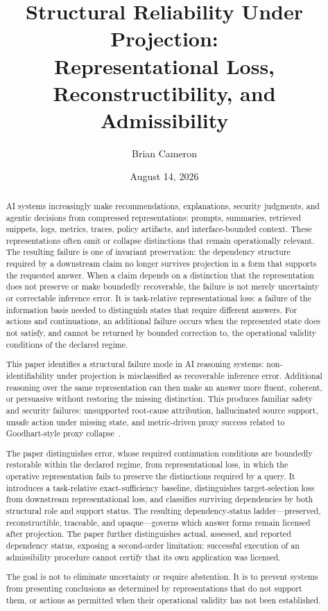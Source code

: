 \documentclass[11pt]{article}
\title{Structural Reliability Under Projection:\\
Representational Loss, Reconstructibility, and Admissibility}
\author{Brian Cameron}
\date{August 14, 2026}
\begin{document}
\maketitle

\begin{abstract}
AI systems increasingly make recommendations, explanations, security judgments, and agentic decisions from compressed representations: prompts, summaries, retrieved snippets, logs, metrics, traces, policy artifacts, and interface-bounded context. These representations often omit or collapse distinctions that remain operationally relevant. The resulting failure is one of invariant preservation: the dependency structure required by a downstream claim no longer survives projection in a form that supports the requested answer. When a claim depends on a distinction that the representation does not preserve or make boundedly recoverable, the failure is not merely uncertainty or correctable inference error. It is task-relative representational loss: a failure of the information basis needed to distinguish states that require different answers. For actions and continuations, an additional failure occurs when the represented state does not satisfy, and cannot be returned by bounded correction to, the operational validity conditions of the declared regime.

This paper identifies a structural failure mode in AI reasoning systems: non-identifiability under projection is misclassified as recoverable inference error. Additional reasoning over the same representation can then make an answer more fluent, coherent, or persuasive without restoring the missing distinction. This produces familiar safety and security failures: unsupported root-cause attribution, hallucinated source support, unsafe action under missing state, and metric-driven proxy success related to Goodhart-style proxy collapse~\cite{Goodhart1975}.

The paper distinguishes error, whose required continuation conditions are boundedly restorable within the declared regime, from representational loss, in which the operative representation fails to preserve the distinctions required by a query. It introduces a task-relative exact-sufficiency baseline, distinguishes target-selection loss from downstream representational loss, and classifies surviving dependencies by both structural role and support status. The resulting dependency-status ladder---preserved, reconstructible, traceable, and opaque---governs which answer forms remain licensed after projection. The paper further distinguishes actual, assessed, and reported dependency status, exposing a second-order limitation: successful execution of an admissibility procedure cannot certify that its own application was licensed.

The goal is not to eliminate uncertainty or require abstention. It is to prevent systems from presenting conclusions as determined by representations that do not support them, or actions as permitted when their operational validity has not been established.
\end{abstract}
\end{document}
